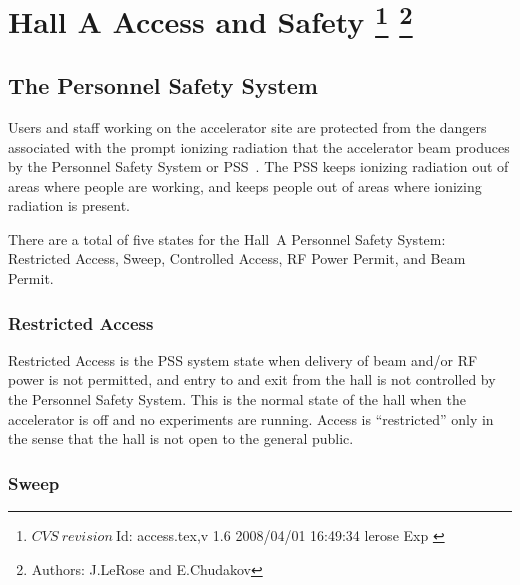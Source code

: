 \chapter[Hall A Access and Safety]{Hall A Access and Safety
\label{sec:chap:access}
\footnote{
  $CVS~revision~ $Id: access.tex,v 1.6 2008/04/01 16:49:34 lerose Exp $ $ 
}
\footnote{Authors: J.LeRose  and
                   E.Chudakov }
}
 
\begin{safetyen}{10}{15}
\section{The Personnel Safety System} 
\label{sec:Access}
\end{safetyen}


 Users and staff working on the accelerator site are protected from
 the dangers associated with the prompt ionizing radiation that the
 accelerator beam produces by the Personnel Safety System or 
 PSS~\cite{PSScebaf}.
 The PSS keeps ionizing radiation out of areas where people are working,
 and keeps people out of areas where ionizing radiation is present.

 There are a total of five states for the Hall~A Personnel Safety
 System: Restricted Access, Sweep, Controlled Access, RF Power Permit,
 and Beam Permit.

\begin{safetyen}{10}{10}
\subsection{Restricted Access}
\end{safetyen}
 
 Restricted Access is the PSS system state when delivery of beam
 and/or RF power is not permitted, and entry to and exit from the hall
 is not controlled by the Personnel Safety System.  This is the normal
 state of the hall when the accelerator is off and no experiments are
 running.  Access is ``restricted'' only in the sense that the hall is
 not open to the general public.

\begin{safetyen}{10}{10}
\subsection{Sweep}
\end{safetyen}


